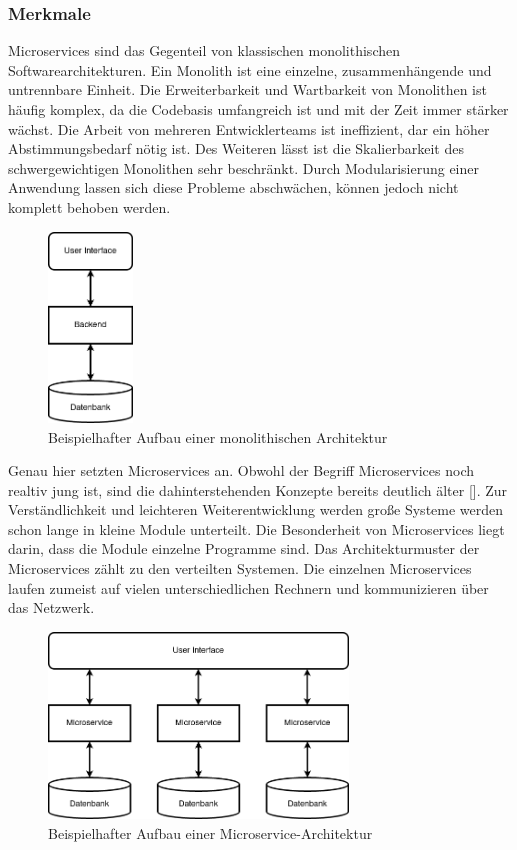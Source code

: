 \subsubsection{Merkmale}

Microservices sind das Gegenteil von klassischen monolithischen Softwarearchitekturen. Ein Monolith ist eine einzelne, zusammenhängende und untrennbare Einheit. Die Erweiterbarkeit und Wartbarkeit von Monolithen ist häufig komplex, da die Codebasis umfangreich ist und mit der Zeit immer stärker wächst. Die Arbeit von mehreren Entwicklerteams ist ineffizient, dar ein höher Abstimmungsbedarf nötig ist. Des Weiteren lässt ist die Skalierbarkeit des schwergewichtigen Monolithen sehr beschränkt. Durch Modularisierung einer Anwendung lassen sich diese Probleme abschwächen, können jedoch nicht komplett behoben werden.

\begin{figure}[H] 
    \centering
    \includegraphics[width=0.2\textwidth]{figures/Monolith.png}
    \caption{Beispielhafter Aufbau einer monolithischen Architektur}
\end{figure}

Genau hier setzten Microservices an. Obwohl der Begriff Microservices noch realtiv jung ist, sind die dahinterstehenden Konzepte bereits deutlich älter [\cite[S. 15]{newmanMicroservices2015}]. Zur Verständlichkeit und leichteren Weiterentwicklung werden große Systeme werden schon lange in kleine Module unterteilt. Die Besonderheit von Microservices liegt darin, dass die Module einzelne Programme sind. Das Architekturmuster der Microservices zählt zu den verteilten Systemen. Die einzelnen Microservices laufen zumeist auf vielen unterschiedlichen Rechnern und kommunizieren über das Netzwerk.

\begin{figure}[H] 
    \centering
    \includegraphics[width=0.71\textwidth]{figures/Microservices.png}
    \caption{Beispielhafter Aufbau einer Microservice-Architektur}
\end{figure}

